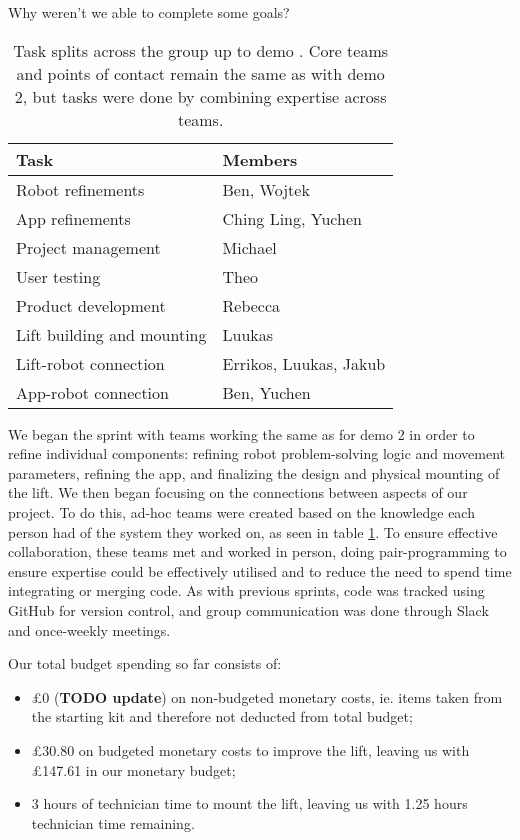 \documentclass{article}
\begin{document}
Why weren't we able to complete some goals?

\begin{table}[]
  \begin{tabular}{l|l}
    Task & Members \\
    \hline
    Robot refinements & Ben, Wojtek \\
    App refinements & Ching Ling, Yuchen \\
    Project management & Michael \\
    User testing & Theo \\
    Product development & Rebecca \\
    Lift building and mounting & Luukas \\
    Lift-robot connection & Errikos, Luukas, Jakub \\
    App-robot connection & Ben, Yuchen \\
  \end{tabular}
  \caption{Task splits across the group up to demo \demoNumber. Core teams and points of contact remain the same as with demo 2, but tasks were done by combining expertise across teams. }
  \label{tab:group-split}
\end{table}

We began the sprint with teams working the same as for demo 2 in order to refine individual components: refining robot problem-solving logic and movement parameters, refining the app, and finalizing the design and physical mounting of the lift. We then began focusing on the connections between aspects of our project. To do this, ad-hoc teams were created based on the knowledge each person had of the system they worked on, as seen in table \ref{tab:group-split}. To ensure effective collaboration, these teams met and worked in person, doing pair-programming to ensure expertise could be effectively utilised and to reduce the need to spend time integrating or merging code. As with previous sprints, code was tracked using GitHub for version control, and group communication was done through Slack and once-weekly meetings.

Our total budget spending so far consists of:
\begin{itemize}
  \item \pounds 0 ({\bf TODO update}) on non-budgeted monetary costs, ie. items taken from the starting kit and therefore not deducted from total budget;
  \item \pounds 30.80 on budgeted monetary costs to improve the lift, leaving us with \pounds 147.61 in our monetary budget; 
  \item 3 hours of technician time to mount the lift, leaving us with 1.25 hours technician time remaining. 
\end{itemize}
\end{document}
